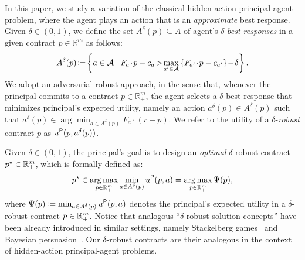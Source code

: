 In this paper, we study a variation of the classical hidden-action principal-agent problem, where the agent plays an action that is an \emph{approximate} best response.
%
Given $\delta \in (0,1)$, we define the set $A^\delta(p) \subseteq {A}$ of agent's $\delta$-\emph{best responses} in a given contract $p \in \mathbb{R}^{m}_{+}$ as follows:
%
\begin{equation*}%
	A^{\delta}(p) \hspace{-.5mm} \coloneqq \hspace{-.5mm} \left \{ a \in \mathcal{A} \mid F_{a} \hspace{-.5mm}\cdot\hspace{-.5mm} p - c_a \hspace{-.5mm}>\hspace{-.5mm} \max_{a' \in \mathcal{A}} \left\{ F_{a'}\hspace{-.5mm} \cdot\hspace{-.5mm} p - c_{a'} \right\}\hspace{-.5mm} - \hspace{-.5mm}\delta \right\}.
\end{equation*}
%
%
We adopt an adversarial robust approach, in the sense that, whenever the principal commits to a contract $p\in\mathbb{R}^{m}_{+}$, the agent selects a $\delta$-best response that minimizes principal's expected utility, namely an action $a^\delta(p) \in 	A^{\delta}(p)$ such that $a^\delta(p) \in \arg\min_{a \in A^\delta(p)}F_{a}\cdot (r-p)$.
%
We refer to the utility of a $\delta$-\emph{robust} contract $p$ as $u^{\mathsf{P}}(p,a^\delta(p))$.

Given $\delta \in (0,1)$, the principal's goal is to design an \emph{optimal} $\delta$-robust contract $p^\star \in \mathbb{R}^{m}_{+}$, which is formally defined as:
%
\begin{equation}\label{eq:delta_opt_def}
	p^\star  \in \operatorname*{arg\,max}_{p \in \mathbb{R}^{m}_{+}} \min_{a \in A^\delta(p)} u^{\mathsf{P}}(p,a) = \operatorname*{arg\,max}_{p \in \mathbb{R}^{m}_{+}} \Psi(p),
\end{equation}
%
where $\Psi(p) \coloneqq \min_{a \in A^\delta(p)} u^{\mathsf{P}}(p, a)$ denotes the principal's expected utility in a $\delta$-robust contract $p\in \mathbb{R}^{m}_{+}$.
%
%
Notice that analogous ``$\delta$-robust solution concepts'' have been already introduced in similar settings, namely Stackelberg games~\citep{gan2024robust} and Bayesian persuasion~\citep{yang2024computational}.
%
Our $\delta$-robust contracts are their analogous in the context of hidden-action principal-agent problems.

